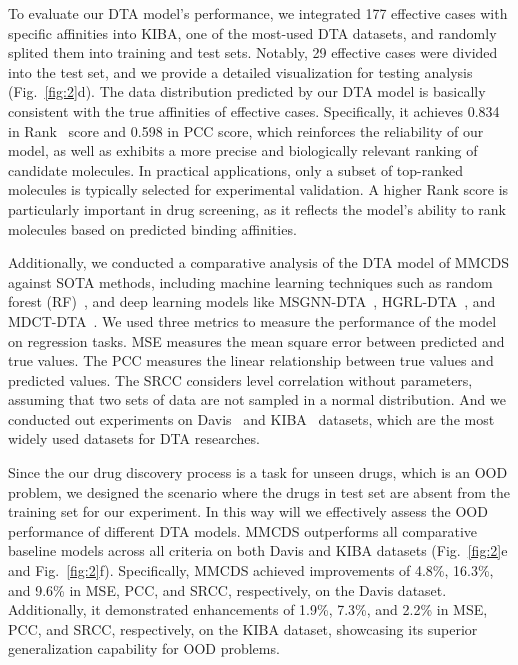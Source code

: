 \documentclass[unnumsec,webpdf,contemporary,large]{oup-authoring-template}%
\theoremstyle{thmstyleone}%
\theoremstyle{thmstyletwo}%
\theoremstyle{thmstylethree}%
\begin{document}
To evaluate our DTA model's performance, we integrated 177 effective cases with specific affinities into KIBA, one of the most-used DTA datasets, and randomly splited them into training and test sets. Notably, 29 effective cases were divided into the test set, and we provide a detailed visualization for testing analysis (Fig.~\ref{fig:2}d). The data distribution predicted by our DTA model is basically consistent with the true affinities of effective cases. Specifically, it achieves 0.834 in Rank~\cite{47} score and 0.598 in PCC score, which reinforces the reliability of our model, as well as exhibits a more precise and biologically relevant ranking of candidate molecules. In practical applications, only a subset of top-ranked molecules is typically selected for experimental validation. A higher Rank score is particularly important in drug screening, as it reflects the model's ability to rank molecules based on predicted binding affinities.

Additionally, we conducted a comparative analysis of the DTA model of MMCDS against SOTA methods, including machine learning techniques such as random forest (RF)~\cite{48,49}, and deep learning models like MSGNN-DTA~\cite{50}, HGRL-DTA~\cite{51}, and MDCT-DTA~\cite{27}. We used three metrics to measure the performance of the model on regression tasks. MSE measures the mean square error between predicted and true values. The PCC measures the linear relationship between true values and predicted values. The SRCC considers level correlation without parameters, assuming that two sets of data are not sampled in a normal distribution. And we conducted out experiments on Davis~\cite{52} and KIBA~\cite{53} datasets, which are the most widely used datasets for DTA researches.

Since the our drug discovery process is a task for unseen drugs, which is an OOD problem, we designed the scenario where the drugs in test set are absent from the training set for our experiment. In this way will we effectively assess the OOD performance of different DTA models. MMCDS outperforms all comparative baseline models across all criteria on both Davis and KIBA datasets (Fig.~\ref{fig:2}e and Fig.~\ref{fig:2}f). Specifically, MMCDS achieved improvements of 4.8\%, 16.3\%, and 9.6\% in MSE, PCC, and SRCC, respectively, on the Davis dataset. Additionally, it demonstrated enhancements of 1.9\%, 7.3\%, and 2.2\% in MSE, PCC, and SRCC, respectively, on the KIBA dataset, showcasing its superior generalization capability for OOD problems.
\end{document}
